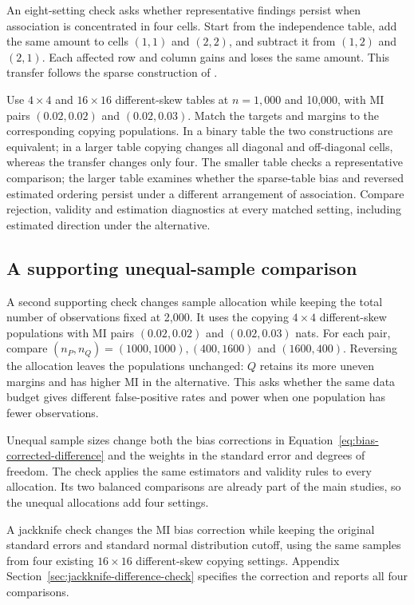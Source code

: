 An eight-setting check asks whether representative findings persist when
association is concentrated in four cells. Start from the independence
table, add the same amount to cells \((1,1)\) and \((2,2)\), and subtract
it from \((1,2)\) and \((2,1)\). Each affected row and column gains and
loses the same amount. This transfer follows the sparse construction of
\citet[Section~3(b)]{berrett2021}.

Use \(4\times4\) and \(16\times16\) different-skew tables at
\(n=1{,}000\) and 10,000,
with MI pairs \((0.02,0.02)\) and \((0.02,0.03)\). Match the targets
and margins to the corresponding copying populations. In a binary table
the two constructions are equivalent; in a larger table copying changes
all diagonal and off-diagonal cells, whereas the transfer changes only four.
The smaller table checks a representative comparison; the larger table
examines whether the sparse-table bias and reversed estimated ordering
persist under a different arrangement of association. Compare rejection,
validity and estimation diagnostics at every matched setting, including
estimated direction under the alternative.

\subsection{A supporting unequal-sample comparison}

A second supporting check changes sample allocation while keeping the
total number of observations fixed at 2,000. It uses the copying
\(4\times4\) different-skew populations with MI pairs
\((0.02,0.02)\) and \((0.02,0.03)\) nats. For each pair, compare
\((n_P,n_Q)=(1000,1000),(400,1600)\) and \((1600,400)\).
Reversing the allocation leaves the populations unchanged: \(Q\) retains
its more uneven margins and has higher MI in the alternative.
This asks whether the same data budget gives different false-positive
rates and power when one population has fewer observations.

Unequal sample sizes change both the bias corrections in
Equation~\eqref{eq:bias-corrected-difference} and the weights in the
standard error and degrees of freedom. The check applies the same
estimators and validity rules to every allocation. Its two balanced
comparisons are already part of the main studies, so the unequal
allocations add four settings.

\medskip
{}

A jackknife check changes the MI bias correction while keeping the
original standard errors and standard normal distribution cutoff,
using the same samples from four existing \(16\times16\) different-skew
copying settings. Appendix Section~\ref{sec:jackknife-difference-check}
specifies the correction and reports all four comparisons.

